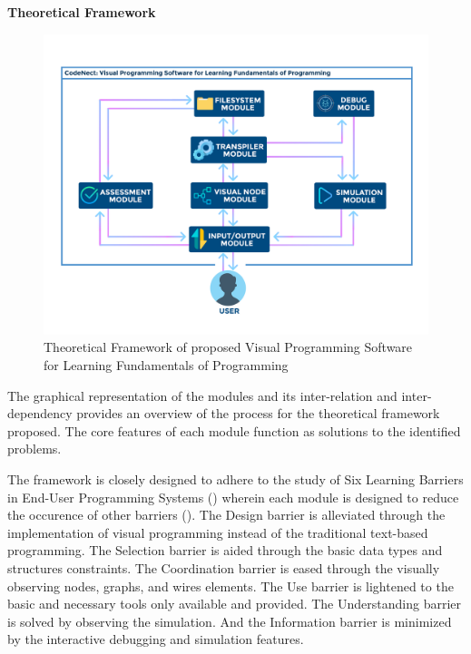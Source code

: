 \flushleft
\textbf{Theoretical Framework}\\

\begin{figure}[H]
	\includegraphics[width=\linewidth]{figures/theoretical_framework.png}
	\caption{Theoretical Framework of proposed Visual Programming Software for Learning
	Fundamentals of Programming}
	\label{fig:theoretical_framework}
\end{figure}

\justifying
The graphical representation of the modules and its inter-relation and inter-dependency
provides an overview of the process for the theoretical framework proposed. The core
features of each module function as solutions to the identified problems.

\par
The framework is closely designed to adhere to the study of Six Learning Barriers in
End-User Programming Systems (\cite{ko_myers_aung_2004}) wherein each module is designed
to reduce the occurence of other barriers (\cite{dao_bøg_2010}). The Design barrier is
alleviated through the implementation of visual programming instead of the traditional
text-based programming. The Selection barrier is aided through the basic data types and
structures constraints. The Coordination barrier is eased through the visually
observing nodes, graphs, and wires elements. The Use barrier is lightened to the basic
and necessary tools only available and provided. The Understanding barrier is solved by
observing the simulation. And the Information barrier is minimized by the interactive
debugging and simulation features.

